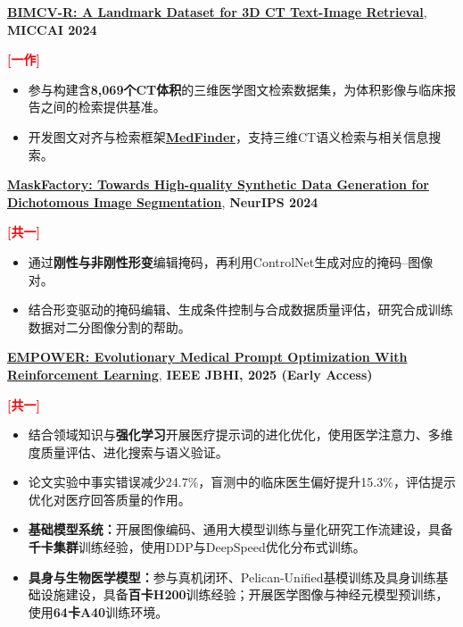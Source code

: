 \documentclass{resume}
\begin{document}
\begin{enumerate}[label=\textbf{[\arabic*]}, leftmargin=2em, itemsep=3pt]
    \item \kaishu \parbox[t]{0.88\linewidth}{\textbf{\href{https://arxiv.org/abs/2403.15992}{BIMCV-R: A Landmark Dataset for 3D CT Text-Image Retrieval}}, \textbf{MICCAI 2024}} \hfill \textcolor{red}{\textbf{[一作]}}
    \begin{itemize}
        \item 参与构建含\textbf{8,069个CT体积}的三维医学图文检索数据集，为体积影像与临床报告之间的检索提供基准。
        \item 开发图文对齐与检索框架\href{https://github.com/ydchen0806/MedFinder}{\textbf{MedFinder}}，支持三维CT语义检索与相关信息搜索。
    \end{itemize}

    \item \kaishu \parbox[t]{0.88\linewidth}{\textbf{\href{https://arxiv.org/abs/2412.19080}{MaskFactory: Towards High-quality Synthetic Data Generation for Dichotomous Image Segmentation}}, \textbf{NeurIPS 2024}} \hfill \textcolor{red}{\textbf{[共一]}}
    \begin{itemize}
        \item 通过\textbf{刚性与非刚性形变}编辑掩码，再利用ControlNet生成对应的掩码--图像对。
        \item 结合形变驱动的掩码编辑、生成条件控制与合成数据质量评估，研究合成训练数据对二分图像分割的帮助。
    \end{itemize}

    \item \kaishu \parbox[t]{0.88\linewidth}{\textbf{\href{https://ieeexplore.ieee.org/document/11205280}{EMPOWER: Evolutionary Medical Prompt Optimization With Reinforcement Learning}}, \textbf{IEEE JBHI, 2025 (Early Access)}} \hfill \textcolor{red}{\textbf{[共一]}}
    \begin{itemize}
        \item 结合领域知识与\textbf{强化学习}开展医疗提示词的进化优化，使用医学注意力、多维度质量评估、进化搜索与语义验证。
        \item 论文实验中事实错误减少24.7\%，盲测中的临床医生偏好提升15.3\%，评估提示优化对医疗回答质量的作用。
    \end{itemize}

\end{enumerate}

\begin{itemize}
    \item \kaishu \textbf{基础模型系统：}开展图像编码、通用大模型训练与量化研究工作流建设，具备\textbf{千卡集群}训练经验，使用DDP与DeepSpeed优化分布式训练。
    \item \kaishu \textbf{具身与生物医学模型：}参与真机闭环、Pelican-Unified基模训练及具身训练基础设施建设，具备\textbf{百卡H200}训练经验；开展医学图像与神经元模型预训练，使用\textbf{64卡A40}训练环境。
\end{itemize}
\end{document}
